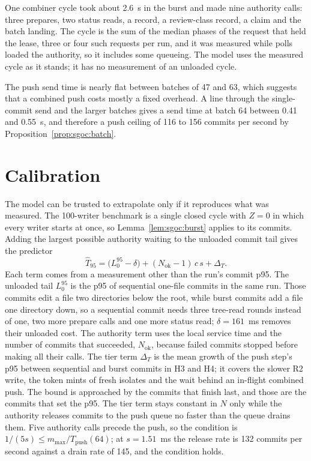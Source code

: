\documentclass[11pt,letterpaper]{article}
\theoremstyle{definition}
\theoremstyle{remark}
\begin{document}
One combiner cycle took about 2.6~s in the burst and made nine authority calls: three prepares, two status reads, a record, a review-class record, a claim and the batch landing. %
The cycle is the sum of the median phases of the request that held the lease, three or four such requests per run, and it was measured while polls loaded the authority, so it includes some queueing. The model uses the measured cycle as it stands; it has no measurement of an unloaded cycle. %

The push send time is nearly flat between batches of 47 and 63, which suggests that a combined push costs mostly a fixed overhead. A line through the single-commit send and the larger batches gives a send time at batch 64 between 0.41 and 0.55~s, and therefore a push ceiling of 116 to 156 commits per second by Proposition~\ref{prop:sgoc:batch}. %

\section{Calibration}
\label{sec:sgoc:calibration}

The model can be trusted to extrapolate only if it reproduces what was measured. The 100-writer benchmark is a single closed cycle with $Z = 0$ in which every writer starts at once, so Lemma~\ref{lem:sgoc:burst} applies to its commits. Adding the largest possible authority waiting to the unloaded commit tail gives the predictor
\begin{equation}
\label{eq:sgoc:burst}
\widehat{T}_{95} = \bigl(L_0^{95} - \delta\bigr) + (N_{\mathrm{ok}} - 1)\, c\, s + \Delta_T .
\end{equation}
Each term comes from a measurement other than the run's commit p95. The unloaded tail $L_0^{95}$ is the p95 of sequential one-file commits in the same run. Those commits edit a file two directories below the root, while burst commits add a file one directory down, so a sequential commit needs three tree-read rounds instead of one, two more prepare calls and one more status read; $\delta = 161$~ms removes their unloaded cost. %
The authority term uses the local service time and the number of commits that succeeded, $N_{\mathrm{ok}}$, because failed commits stopped before making all their calls. The tier term $\Delta_T$ is the mean growth of the push step's p95 between sequential and burst commits in H3 and H4; it covers the slower R2 write, the token mints of fresh isolates and the wait behind an in-flight combined push. %
The bound is approached by the commits that finish last, and those are the commits that set the p95. The tier term stays constant in $N$ only while the authority releases commits to the push queue no faster than the queue drains them. Five authority calls precede the push, so the condition is $1/(5s) \le m_{\max}/T_{\mathrm{push}}(64)$; at $s = 1.51$~ms the release rate is 132 commits per second against a drain rate of 145, and the condition holds.
\end{document}
